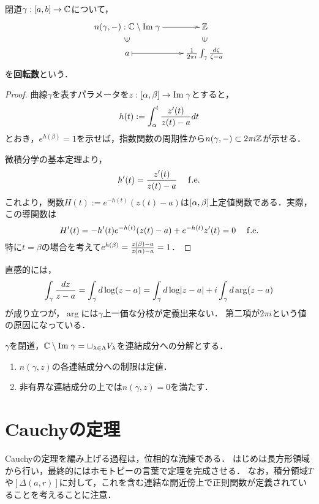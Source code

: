 \documentclass[uplatex, dvipdfmx]{jsreport}
\begin{document}
\begin{definition}
    閉道$\gamma:[a,b]\to\mathbb{C}$について，
    \[\xymatrix@R-2pc{
        n(\gamma,-):\C\setminus\Im\gamma\ar[r]&\Z\\
        \rotatebox[origin=c]{90}{$\in$}&\rotatebox[origin=c]{90}{$\in$}\\
        a\ar@{|->}[r]&\frac{1}{2\pi i}\int_\gamma\frac{d\zeta}{\zeta-a}
    }\]
    を\textbf{回転数}という．
\end{definition}
\begin{proof}
    曲線$\gamma$を表すパラメータを$z:[\alpha,\beta]\to\mathrm{Im}\;\gamma$とすると，
    \[h(t):=\int^t_\alpha\frac{z'(t)}{z(t)-a}dt\]
    とおき，$e^{h(\beta)}=1$を示せば，指数関数の周期性から$n(\gamma,-)\subset 2\pi i\mathbb{Z}$が示せる．

    微積分学の基本定理より，
    \[h'(t)=\frac{z'(t)}{z(t)-a}\quad\;\mathrm{f.e.}\]
    これより，関数$H(t):=e^{-h(t)}(z(t)-a)$は$[\alpha,\beta]$上定値関数である．実際，この導関数は
    \[H'(t)=-h'(t)e^{-h(t)}(z(t)-a)+e^{-h(t)}z'(t)=0\quad\;\mathrm{f.e.}\]
    特に$t=\beta$の場合を考えて$e^{h(\beta)}=\frac{z(\beta)-a}{z(\alpha)-a}=1$．
\end{proof}
\begin{remarks}[対数関数のRiemann面を登っていく描像]
    直感的には，
    \[\int_\gamma\frac{dz}{z-a}=\int_\gamma d\log(z-a)=\int_\gamma d\log\lvert z-a\rvert+i\int_\gamma d\arg(z-a)\]
    が成り立つが，$\arg$には$\gamma$上一価な分枝が定義出来ない．
    第二項が$2\pi i$という値の原因になっている．
\end{remarks}

\begin{proposition}[回転数の性質]
    $\gamma$を閉道，$\mathbb{C}\setminus\mathrm{Im}\;\gamma=\sqcup_{\lambda\in\Lambda}V_\lambda$を連結成分への分解とする．
    \begin{enumerate}
        \item $n(\gamma,z)$の各連結成分への制限は定値．
        \item 非有界な連結成分の上では$n(\gamma,z)=0$を満たす．
    \end{enumerate}
\end{proposition}

\section{Cauchyの定理}

\begin{tcolorbox}[colframe=ForestGreen, colback=ForestGreen!10!white,breakable,colbacktitle=ForestGreen!40!white,coltitle=black,fonttitle=\bfseries\sffamily,
title=]
    Cauchyの定理を編み上げる過程は，位相的な洗練である．
    はじめは長方形領域から行い，最終的にはホモトピーの言葉で定理を完成させる．
    なお，積分領域$T$や$[\Delta(a,r)]$に対して，これを含む連結な開近傍上で正則関数が定義されていることを考えることに注意．
\end{tcolorbox}
\end{document}
